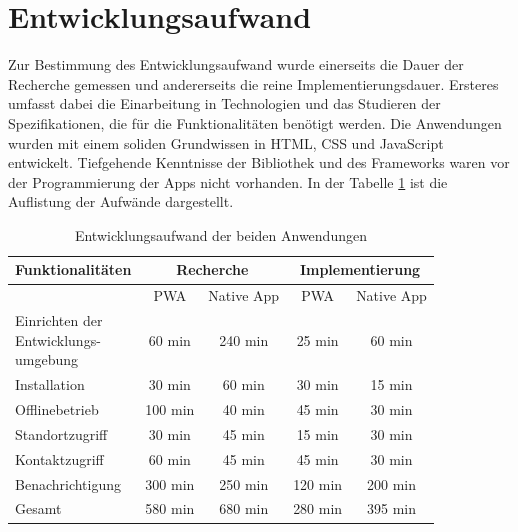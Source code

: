 \section{Entwicklungsaufwand}
Zur Bestimmung des Entwicklungsaufwand wurde einerseits die Dauer der Recherche gemessen und andererseits die reine Implementierungsdauer.
Ersteres umfasst dabei die Einarbeitung in Technologien und das Studieren der Spezifikationen, die für die Funktionalitäten benötigt werden.
Die Anwendungen wurden mit einem soliden Grundwissen in HTML, CSS und JavaScript entwickelt.
Tiefgehende Kenntnisse der Bibliothek und des Frameworks waren vor der Programmierung der Apps nicht vorhanden.
In der Tabelle \ref{fig:outlay_comparison} ist die Auflistung der Aufwände dargestellt.

\begin{table}[h]
\centering
\caption{Entwicklungsaufwand der beiden Anwendungen}
\begin{tabular}[h]{|p{3cm}||c|c|c|c|}
\hline
\textbf{Funktionalitäten} & \multicolumn{2}{|c|}{\textbf{Recherche}} &\multicolumn{2}{c|}{\textbf{Implementierung}} \\
\hline
 & PWA & Native App & PWA & Native App \\
\hline
\makecell{Einrichten der\\Entwicklungs-\\umgebung} & 60 min & 240 min & 25 min & 60 min \\
\hline
Installation & 30 min & 60 min & 30 min & 15 min \\
\hline
Offlinebetrieb & 100 min & 40 min & 45 min & 30 min \\
\hline
Standortzugriff & 30 min & 45 min & 15 min & 30 min \\
\hline
Kontaktzugriff & 60 min & 45 min & 45 min & 30 min \\
\hline
Benachrichtigung & 300 min & 250 min & 120 min & 200 min \\
\hline
\hline
Gesamt & 580 min & 680 min & 280 min & 395 min \\
\hline
\end{tabular}
\label{fig:outlay_comparison}
\end{table}

